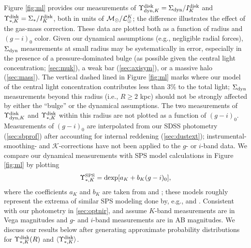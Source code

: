 \documentclass[apj,iop,numberedappendix]{emulateapj}
\begin{document}
Figure \ref{fig:ml} provides our measurements of $\Upsilon_{{\rm dyn},K}^{\rm disk} = \Sigma_{\rm dyn}/I_K^{\rm
disk}$ and $\Upsilon_{\ast,K}^{\rm disk} = \Sigma_{\rm \ast}/I_K^{\rm disk}$, both in units of $\mathcal{M}_\odot/\mathcal{L}_\odot^K$;
the difference illustrates the effect of the gas-mass correction.  These data
are plotted both as a function of radius and $(g-i)_0$ color.  Given our
dynamical assumptions (e.g., negligible radial forces), $\Sigma_{\rm dyn}$ measurements
at small radius may be systematically in error, especially in the presence of a
pressure-dominated bulge (as possible given the central light concentration;
\sect \ref{sec:muk}), a weak bar (\sect \ref{sec:axisym}), or a massive halo
(\sect \ref{sec:mass}).  The vertical dashed lined in Figure \ref{fig:ml} marks
where our model of the central light concentration contributes less than 3\% to
the total light; $\Sigma_{\rm dyn}$ measurements beyond this radius (i.e., $R\geq2$ kpc)
should not be strongly affected by either the ``bulge'' or the dynamical
assumptions.  The two measurements of $\Upsilon_{{\rm dyn},K}^{\rm disk}$ and $\Upsilon_{\ast,K}^{\rm disk}$ within this
radius are not plotted as a function of $(g-i)_0$.  Measurements of $(g-i)_0$
are interpolated from our SDSS photometry (\sect \ref{sec:sbprof}) after
accounting for internal reddening (\sect \ref{sec:dustext});
instrumental-smoothing- and ${\mathcal K}$-corrections have not been applied to
the $g$- or $i$-band data.  We compare our dynamical measurements with SPS model
calculations in Figure \ref{fig:ml} by plotting
%
\begin{equation}
%
\mlsksps = {\rm dexp}[a_K + b_K (g-i)_0],
%
\label{eq:brml}
%
\end{equation}
%
where the coefficients $a_K$ and $b_K$ are taken from \citet[][$a_K=-0.211$ and
$b_K=0.137$, hereafter ]{2003ApJS..149..289B}
and \citet[][$a_K=-1.379$ and $b_K=0.604$, hereafter
]{2009MNRAS.400.1181Z}; these models roughly
represent the extrema of similar SPS modeling done by, e.g.,
\citet{2001ApJ...550..212B} and \citet{2004MNRAS.347..691P}.  Consistent with
our photometry in \sect \ref{sec:optnir},  and
 assume $K$-band measurements are in Vega
magnitudes and $g$- and $i$-band measurements are in AB magnitudes.  We discuss
our results below after generating approximate probability distributions for
$\Upsilon_{\ast,K}^{\rm disk}(R)$ and $\langle \Upsilon_{\ast,K}^{\rm disk} \rangle$.
\end{document}
